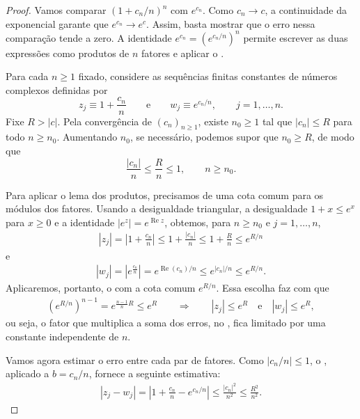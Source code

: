 \documentclass[12pt,portuguese]{article}
\theoremstyle{definition}
\theoremstyle{plainexercise}
\theoremstyle{starredexercise}
\theoremstyle{definition}
\begin{document}
\begin{proof}
Vamos comparar $(1+c_n/n)^n$ com $e^{c_n}$. Como $c_n\to c$, a
continuidade da exponencial garante que $e^{c_n}\to e^c$. Assim, basta
mostrar que o erro nessa comparação tende a zero. A identidade
$e^{c_n}=(e^{c_n/n})^n$ permite escrever as duas expressões como produtos
de $n$ fatores e aplicar o .

Para cada $n\geqslant1$ fixado, considere as sequências finitas constantes
de números complexos definidas por
\[
z_j \equiv 1+\frac{c_n}{n}
\qquad\text{e}\qquad
w_j \equiv e^{c_n/n},
\qquad j=1,\ldots,n.
\]
Fixe $R>|c|$. Pela convergência de $(c_n)_{n\geqslant1}$, existe $n_0\geqslant1$
tal que $|c_n|\leqslant R$ para todo $n\geqslant n_0$. Aumentando $n_0$,
se necessário, podemos supor que $n_0\geqslant R$, de modo que
\[
\frac{|c_n|}{n}\leqslant\frac{R}{n}\leqslant1,
\qquad n\geqslant n_0.
\]

Para aplicar o lema dos produtos, precisamos de uma cota comum para os
módulos dos fatores. Usando a desigualdade triangular,
a desigualdade $1+x\leqslant e^x$ para $x\geqslant0$ e a identidade
$|e^z|=e^{\operatorname{Re}z}$, obtemos, para $n\geqslant n_0$ e
$j=1,\ldots,n$,
\begin{align*}
|z_j|
= \left|1+\frac{c_n}{n}\right|
\leqslant 1+\frac{|c_n|}{n}
\leqslant 1+\frac{R}{n}
\leqslant e^{R/n}
\end{align*}
e
\begin{align*}
|w_j|
= \left| e^{\frac{c_n}{n}} \right|
= e^{\operatorname{Re}(c_n)/n}
\leqslant e^{|c_n|/n}
\leqslant e^{R/n}.
\end{align*}
Aplicaremos, portanto, o  com a cota
comum $e^{R/n}$. Essa escolha faz com que
\begin{align}\label{cota-aux1-lim-exp}
(e^{R/n})^{n-1} = e^{\frac{n-1}{n} R} \leqslant e^R
\qquad  \Longrightarrow \qquad
|z_j| \leqslant e^R
\quad \text{e}\quad
|w_j| \leqslant e^R,
\end{align}
ou seja, o fator que multiplica a soma
dos erros, no ,
fica limitado por uma constante independente de $n$.

Vamos agora estimar o erro entre cada par de fatores. Como
$|c_n/n|\leqslant1$, o , aplicado a
$b=c_n/n$, fornece a seguinte estimativa:
\begin{align}\label{cota-aux2-lim-exp}
|z_j-w_j|
=\left|1+\frac{c_n}{n}-e^{c_n/n}\right|
\leqslant\frac{|c_n|^2}{n^2}
\leqslant\frac{R^2}{n^2}.
\end{align}


\end{proof}
\end{document}

